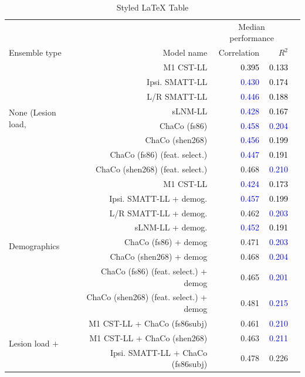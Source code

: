 \documentclass[10pt]{article}
\def\Plus{\texttt{+}}
\newcommand{\colorNavyBlue}[1]{\textcolor{NavyBlue}{#1}}
\newcommand{\colorBlack}[1]{\textcolor{Black}{#1}}
\newcommand{\colorBlue}[1]{\textcolor{Blue}{#1}}
\begin{document}
\begin{table}[h]
\centering
\caption{Styled LaTeX Table}
\label{table:5}
\begin{tabular}{lrrrr}
\toprule
 &  & \multicolumn{2}{c}{Median performance} \\
Ensemble type & Model name & Correlation & $R^2$  \\
\midrule
\multirow[t]{8}{*}{None (Lesion load,} &  M1 CST-LL & \colorBlack{0.395} & \colorBlack{0.133} \\
 ChaCo only)& Ipsi. SMATT-LL & \colorBlue{0.430} & \colorBlack{0.174} \\
 & L/R SMATT-LL & \colorBlue{0.446} & \colorBlack{0.188} \\
 & sLNM-LL & \colorBlue{0.428} & \colorBlack{0.167} \\
 & ChaCo (fs86) & \colorBlue{0.458} & \colorBlue{0.204} \\
 & ChaCo (shen268) & \colorBlue{0.456} & \colorBlack{0.199} \\
 & ChaCo (fs86) (feat. select.) & \colorBlue{0.447} & \colorBlack{0.191} \\
 & ChaCo (shen268) (feat. select.) & \colorNavyBlue{0.468} & \colorBlue{0.210} \\
\multirow[t]{8}{*}{Demographics} & M1 CST-LL & \colorBlue{0.424} & \colorBlack{0.173} \\
 & Ipsi. SMATT-LL + demog. & \colorBlue{0.457} & \colorBlack{0.199} \\
 & L/R SMATT-LL + demog. & \colorNavyBlue{0.462} & \colorBlue{0.203} \\
 & sLNM-LL + demog. & \colorBlue{0.452} & \colorBlack{0.191} \\
 & ChaCo (fs86) + demog & \colorNavyBlue{0.471} & \colorBlue{0.203} \\
 & ChaCo (shen268) + demog & \colorNavyBlue{0.468} & \colorBlue{0.204} \\
 & ChaCo (fs86) (feat. select.) + demog & \colorNavyBlue{0.465} & \colorBlue{0.201} \\
 & ChaCo (shen268) (feat. select.) + demog & \colorNavyBlue{0.481} & \colorBlue{0.215} \\
\multirow[t]{16}{*}{Lesion load $\Plus$} & M1 CST-LL + ChaCo (fs86subj) & \colorNavyBlue{0.461} & \colorBlue{0.210} \\
 ChaCo & M1 CST-LL + ChaCo (shen268) & \colorNavyBlue{0.463} & \colorBlue{0.211} \\
 & Ipsi. SMATT-LL + ChaCo (fs86subj) & \colorNavyBlue{0.478} & \colorNavyBlue{0.226} \\

\end{tabular}
\end{table}
\end{document}
